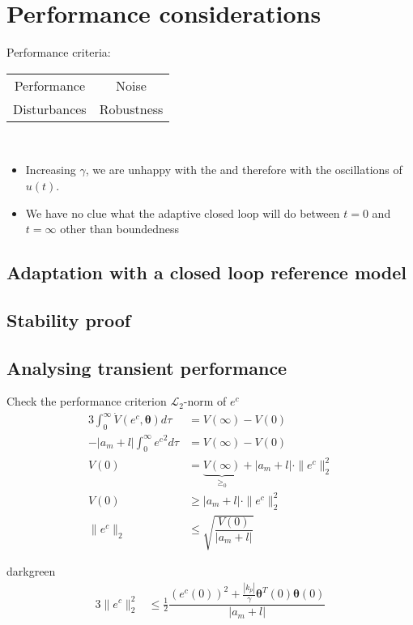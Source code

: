 \section{Performance considerations}
Performance criteria:
\begin{center}
\begin{tabu} to \columnwidth {cc}
Performance & Noise\\
Disturbances    & Robustness
\end{tabu}
\end{center}~

\begin{itemize}
\item Increasing $\gamma$, we are unhappy with the
    and therefore with the oscillations of $u(t)$.
\item We have no clue what the adaptive closed loop
    will do between $t=0$ and $t=\infty$ other than boundedness
\end{itemize}

\subsection{Adaptation with a closed loop reference model}


\subsection{Stability proof}


\subsection{Analysing transient performance}
Check the performance criterion $ \mathcal{L}_2$-norm of $e^c$
\begin{alignat*}{3}
\int_0^\infty \dot{V}(e^c, \bm{\theta}) d\tau &= V(\infty) - V(0)\\
-| a_m + l |\int_0^\infty {e^c}^2 d\tau &= V(\infty) - V(0)\\
V(0) &= \underbrace{V(\infty)}_{\geq_0} + |a_m + l| \cdot \| e^c \|_2^2\\%
V(0) &\geq |a_m + l| \cdot \| e^c \|_2^2 \\
\| e^c \|_2 &\leq \sqrt{\dfrac{V(0)}{|a_m + l|}}
\end{alignat*}

\begin{conclusion}{darkgreen}
\begin{alignat}{3}
\| e^c \|_2^2 &\leq \frac{1}{2} \dfrac{(e^c(0))^2 + \frac{|k_p|}{\gamma} \bm{\theta}^T(0) \bm{\theta}(0)}{|a_m + l|} 
    \label{eq:ec-2norm}
\end{alignat}
\end{conclusion}

